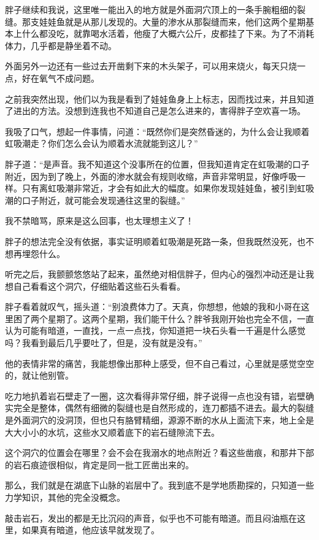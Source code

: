 胖子继续和我说，这里唯一能出入的地方就是外面洞穴顶上的一条手腕粗细的裂缝。那支娃娃鱼就是从那儿发现的。大量的渗水从那裂缝而来，他们这两个星期基本上什么都没吃，就靠喝水活着，他瘦了大概六公斤，皮都挂了下来。为了不消耗体力，几乎都是静坐着不动。

外面另外一边还有一些过去开凿剩下来的木头架子，可以用来烧火，每天只烧一点，好在氧气不成问题。

之前我突然出现，他们以为我是看到了娃娃鱼身上上标志，因而找过来，并且知道了进出的方法。没想到连我也不知道自己是怎么进来的，害得胖子空欢喜一场。

我吸了口气，想起一件事情，问道：“既然你们是突然昏迷的，为什么会让我顺着虹吸潮走？你们怎么会认为顺着水流就能到这儿？”

胖子道：“是声音。我不知道这个没事所在的位置，但我知道肯定在虹吸潮的口子附近，因为到了晚上，外面的渗水就会有规则收缩，声音非常明显，好像呼吸一样。只有离虹吸潮非常近，才会有如此大的幅度。如果你发现娃娃鱼，被引到虹吸潮的口子附近，就可能会发现通往这里的裂缝。”

我不禁暗骂，原来是这么回事，也太理想主义了！

胖子的想法完全没有依据，事实证明顺着虹吸潮是死路一条，但我既然没死，也不想再埋怨什么。

听完之后，我颤颤悠悠站了起来，虽然绝对相信胖子，但内心的强烈冲动还是让我想自己看看这个洞穴，仔细贴着这些石头看看。

胖子看着就叹气，摇头道：“别浪费体力了。天真，你想想，他娘的我和小哥在这里困了两个星期了。这两个星期，我们能干什么？胖爷我刚开始也完全不信，一直认为可能有暗道，一直找，一点一点找，你知道把一块石头看一千遍是什么感觉吗？我看到最后几乎要吐了，但是，没有就是没有。”

他的表情非常的痛苦，我能想像出那种上感受，但不自己看过，心里就是感觉空空的，就让他别管。

吃力地扒着岩石壁走了一圈，这次看得非常仔细，胖子说得一点也没有错，岩壁确实完全是整体，偶然有细微的裂缝也是自然形成的，连刀都插不进去。最大的裂缝是外面洞穴的没洞顶，但也只有胳臂精细，源源不断的水从上面流下来，地上全是大大小小的水坑，这些水又顺着底下的岩石缝隙流下去。

这个洞穴的位置会在哪里？会不会在我溺水的地点附近？看这些凿痕，和那井下部的岩石痕迹很相似，肯定是同一批工匠凿出来的。

那么，我们就是在湖底下山脉的岩层中了。我到底不是学地质勘探的，只知道一些力学知识，其他的完全没概念。

敲击岩石，发出的都是无比沉闷的声音，似乎也不可能有暗道。而且闷油瓶在这里，如果真有暗道，他应该早就发现了。

